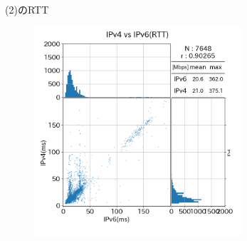 \begin{figure}[htbp]
\begin{center}
\begin{subfigure}[b]{0.49\textwidth}
            \label{new_diffISP_rtt}
        \end{subfigure}
        \caption{(2)のRTT}
        \label{fig:new_isp_rtt}
    \end{center}
\end{figure}
\FloatBarrier

\begin{figure}[htbp]
    \begin{center}
        \begin{minipage}[t]{0.48\textwidth}
            \begin{center}
                \begin{subfigure}[b]{\textwidth}
                    \centering
                    \includegraphics[width=0.85\textwidth]{fig/old_FTTH_rtt.png}
                    \label{old_FTTH_rtt}
                \end{subfigure}
                \begin{subfigure}[b]{\textwidth}
                    \centering

\end{subfigure}
\end{center}
\end{minipage}
\end{center}
\end{figure}
